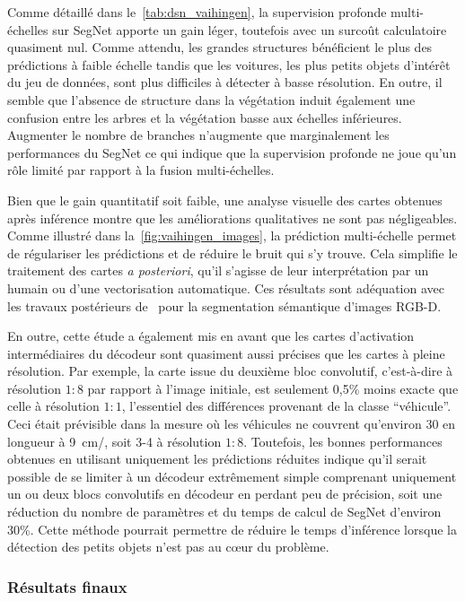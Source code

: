 Comme détaillé dans le~\cref{tab:dsn_vaihingen}, la supervision profonde multi-échelles sur SegNet apporte un gain léger, toutefois avec un surcoût calculatoire quasiment nul. Comme attendu, les grandes structures bénéficient le plus des prédictions à faible échelle tandis que les voitures, les plus petits objets d'intérêt du jeu de données, sont plus difficiles à détecter à basse résolution. En outre, il semble que l'absence de structure dans la végétation induit également une confusion entre les arbres et la végétation basse aux échelles inférieures. Augmenter le nombre de branches n'augmente que marginalement les performances du SegNet ce qui indique que la supervision profonde ne joue qu'un rôle limité par rapport à la fusion multi-échelles.

Bien que le gain quantitatif soit faible, une analyse visuelle des cartes obtenues après inférence montre que les améliorations qualitatives ne sont pas négligeables. Comme illustré dans la~\cref{fig:vaihingen_images}, la prédiction multi-échelle permet de régulariser les prédictions et de réduire le bruit qui s'y trouve. Cela simplifie le traitement des cartes \emph{a posteriori}, qu'il s'agisse de leur interprétation par un humain ou d'une vectorisation automatique. Ces résultats sont adéquation avec les travaux postérieurs de~\citet{jiang_rednet_2018} pour la segmentation sémantique d'images \gls{RGB-D}.

En outre, cette étude a également mis en avant que les cartes d'activation intermédiaires du décodeur sont quasiment aussi précises que les cartes à pleine résolution. Par exemple, la carte issue du deuxième bloc convolutif, c'est-à-dire à résolution $1:8$ par rapport à l'image initiale, est seulement 0,5\% moins exacte que celle à résolution $1:1$, l'essentiel des différences provenant de la classe ``véhicule''. Ceci était prévisible dans la mesure où les véhicules ne couvrent qu'environ \SI{30}{\px} en longueur à \SI{9}{\centi\meter/\px}, soit 3-\SI{4}{\px} à résolution $1:8$. Toutefois, les bonnes performances obtenues en utilisant uniquement les prédictions réduites indique qu'il serait possible de se limiter à un décodeur extrêmement simple comprenant uniquement un ou deux blocs convolutifs en décodeur en perdant peu de précision, soit une réduction du nombre de paramètres et du temps de calcul de SegNet d'environ 30\%. Cette méthode pourrait permettre de réduire le temps d'inférence lorsque la détection des petits objets n'est pas au c\oe{}ur du problème.

\subsubsection{Résultats finaux}

